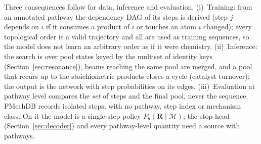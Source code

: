 \documentclass[11pt,a4paper]{article}
\newcommand{\vb}[1]{\bm{#1}}
\begin{document}
Three consequences follow for data, inference and evaluation. (i)~Training: from an annotated pathway the dependency DAG of its steps is derived (step $j$ depends on $i$ if it consumes a product of $i$ or touches an atom $i$ changed); every topological order is a valid trajectory and all are used as training sequences, so the model does not learn an arbitrary order as if it were chemistry. (ii)~Inference: the search is over pool states keyed by the multiset of identity keys (Section~\ref{sec:resonance}), beams reaching the same pool are merged, and a pool that recurs up to the stoichiometric products closes a cycle (catalyst turnover); the output is the network with step probabilities on its edges. (iii)~Evaluation at pathway level compares the \emph{set} of steps and the final pool, never the sequence. PMechDB records isolated steps, with no pathway, step index or mechanism class. On it the model is a single-step policy $P_\theta(\vb{R}\mid\mathcal{M})$; the stop head (Section~\ref{sec:decoder}) and every pathway-level quantity need a source with pathways.
\end{document}
